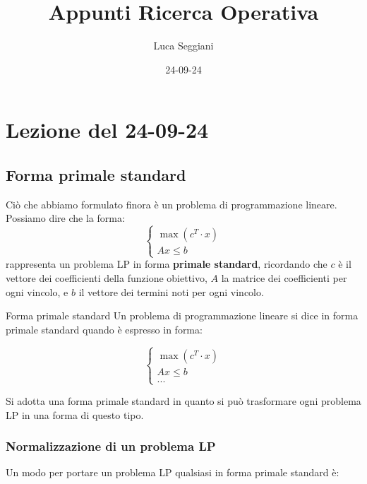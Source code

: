 \documentclass[a4paper,11pt]{article}
\title{Appunti Ricerca Operativa}
\author{Luca Seggiani}
\date{24-09-24}
\begin{document}
\section{Lezione del 24-09-24}

\thispagestyle{empty}
\pagestyle{fancy}


\subsection{Forma primale standard}
Ciò che abbiamo formulato finora è un problema di programmazione lineare.
Possiamo dire che la forma:
\[
	\begin{cases}
			\max(c^T \cdot x) \\
			A x \leq b
	\end{cases}
\]
rappresenta un problema LP in forma \textbf{primale standard}, ricordando che $c$ è il vettore dei coefficienti della funzione obiettivo, $A$ la matrice dei coefficienti per ogni vincolo, e $b$ il vettore dei termini noti per ogni vincolo.

\begin{definition}{Forma primale standard}
	Un problema di programmazione lineare si dice in forma primale standard quando è espresso in forma:
	
	\[
		\begin{cases}
			\max(c^T \cdot x) \\
			Ax \leq b \\
			...
		\end{cases}
	\]

\end{definition}
\par\smallskip
Si adotta una forma primale standard in quanto si può trasformare ogni problema LP in una forma di questo tipo.

\subsubsection{Normalizzazione di un problema LP}
Un modo per portare un problema LP qualsiasi in forma primale standard è:
\end{document}
